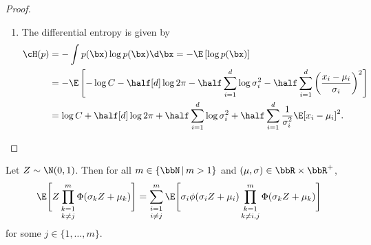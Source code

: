 \begin{proof}
\begin{enumerate}[label=(\roman*)]
  \item The differential entropy is given by
  \begin{align*}
    \cH(p) &= -\int p(\bx) \log p(\bx) \d \bx = -\E \left[ \log p(\bx) \right] \\
    &= -\E \left[-\log C - \half[d] \log 2\pi - \half \sum_{i=1}^d \log \sigma_i^2 - \half \sum_{i=1}^d \left( \frac{x_i - \mu_i}{\sigma_i} \right)^2 \right] \\
    &= \log C + \half[d] \log 2\pi + \half \sum_{i=1}^d \log \sigma_i^2 + \half \sum_{i=1}^d \frac{1}{\sigma_i^2} \E [ x_i - \mu_i ]^2.
  \end{align*}
\end{enumerate}  
\end{proof}

\begin{lemma}\label{lem:EZgZ}
  Let $Z \sim \N(0,1)$. Then for all $m \in \{\bbN \, | \, m > 1\}$ and $(\mu, \sigma) \in \bbR \times \bbR^+$, 
  \[
    \E \Bigg[ Z \mathop{\prod_{k=1}^m}_{k \neq j} \Phi(\sigma_k Z + \mu_k) \Bigg]
    = \mathop{\sum_{i=1}^m}_{i \neq j} \E \Bigg[ \sigma_i \phi(\sigma_i Z + \mu_i) \mathop{\prod_{k=1}^m}_{k \neq i,j} \Phi (\sigma_k Z + \mu_k) \Bigg]
  \]
  for some $j \in \{1, \dots, m\}$.
\end{lemma}

